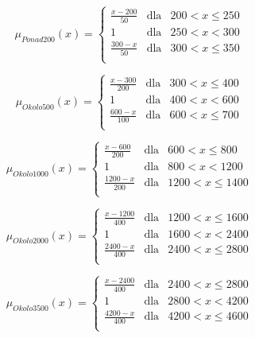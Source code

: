 \documentclass{classrep}
\begin{document}
\begin{equation}
\mu _{Ponad200}(x) =  \left\{ \begin{array}{rcl}
\frac{x - 200}{50} & \mbox{dla} & 200 < x \leq 250\\
1 & \mbox{dla} & 250 < x < 300\\
\frac{300 - x}{50} & \mbox{dla} & 300 < x \leq 350\\
\end{array}\right.
\end{equation}

\begin{equation}
\mu _{Okolo500}(x) =  \left\{ \begin{array}{rcl}
\frac{x - 300}{200} & \mbox{dla} & 300 < x \leq 400\\
1 & \mbox{dla} & 400 < x < 600\\
\frac{600 - x}{100} & \mbox{dla} & 600 < x \leq 700\\
\end{array}\right.
\end{equation}

\begin{equation}
\mu _{Okolo1000}(x) =  \left\{ \begin{array}{rcl}
\frac{x - 600}{200} & \mbox{dla} & 600 < x \leq 800\\
1 & \mbox{dla} & 800 < x < 1200\\
\frac{1200 - x}{200} & \mbox{dla} & 1200 < x \leq 1400\\
\end{array}\right.
\end{equation}

\begin{equation}
\mu _{Okolo2000}(x) =  \left\{ \begin{array}{rcl}
\frac{x - 1200}{400} & \mbox{dla} & 1200 < x \leq 1600\\
1 & \mbox{dla} & 1600 < x < 2400\\
\frac{2400 - x}{400} & \mbox{dla} & 2400 < x \leq 2800\\
\end{array}\right.
\end{equation}

\begin{equation}
\mu _{Okolo3500}(x) =  \left\{ \begin{array}{rcl}
\frac{x - 2400}{400} & \mbox{dla} & 2400 < x \leq 2800\\
1 & \mbox{dla} & 2800 < x < 4200\\
\frac{4200 - x}{400} & \mbox{dla} & 4200 < x \leq 4600\\
\end{array}\right.
\end{equation}
\end{document}
